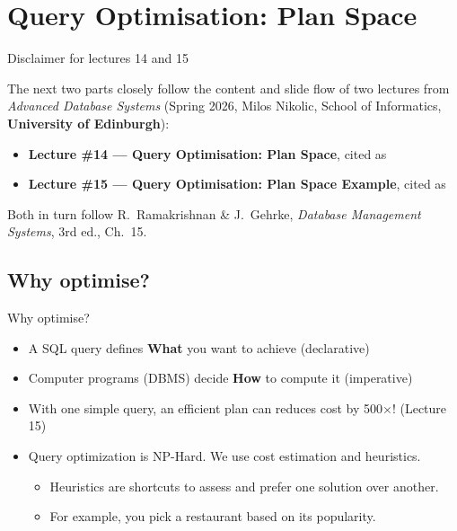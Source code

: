 \section{Query Optimisation: Plan Space}

\begin{frame}{Disclaimer for lectures 14 and 15}
  \begin{keybox}[Source]
    The next two parts closely follow the content and slide flow of two lectures from
    \emph{Advanced Database Systems} (Spring 2026, Milos Nikolic, School of Informatics,
    \textbf{University of Edinburgh}):
    \begin{itemize}
      \item \textbf{Lecture \#14 --- Query Optimisation: Plan Space}, cited as 
      \item \textbf{Lecture \#15 --- Query Optimisation: Plan Space Example}, cited as 
    \end{itemize}
    Both in turn follow R.~Ramakrishnan \& J.~Gehrke, \emph{Database Management Systems}, 3rd ed., Ch.~15.
  \end{keybox}
\end{frame}

\subsection{Why optimise?}
\begin{frame}{Why optimise?}
  \begin{itemize}
    \item A SQL query defines \textbf{What} you want to achieve (declarative)
    \item Computer programs (DBMS) decide \textbf{How} to compute it (imperative)
    \item With one simple query, an efficient plan can reduces cost by 500$\times$! (Lecture 15)
    \item Query optimization is NP-Hard. We use cost estimation and heuristics.
    \begin{itemize}
      \item Heuristics are shortcuts to assess and prefer one solution over another.
      \item For example, you pick a restaurant based on its popularity.
    \end{itemize}
  \end{itemize}
\end{frame}

